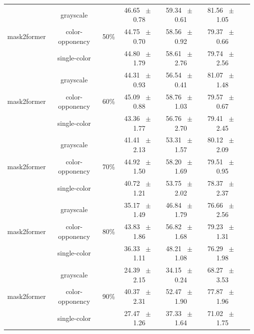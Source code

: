 \begin{table}[h]
\begin{tabular}{@{}lccc ccc@{}}
    \midrule
    \multirow{3}{*}{mask2former} & grayscale & \multirow{3}{*}{50\%} & 46.65 ~$\pm$~ 0.78 & 59.34 ~$\pm$~ 0.61 & 81.56 ~$\pm$~ 1.05 \\
    & color-opponency &  & 44.75 ~$\pm$~ 0.70 & 58.56 ~$\pm$~ 0.92 & 79.37 ~$\pm$~ 0.66 \\
    & single-color &  & 44.80 ~$\pm$~ 1.79 & 58.61 ~$\pm$~ 2.76 & 79.74 ~$\pm$~ 2.56 \\
    \midrule
    \multirow{3}{*}{mask2former} & grayscale & \multirow{3}{*}{60\%} & 44.31 ~$\pm$~ 0.93 & 56.54 ~$\pm$~ 0.41 & 81.07 ~$\pm$~ 1.48 \\
    & color-opponency &  & 45.09 ~$\pm$~ 0.88 & 58.76 ~$\pm$~ 1.03 & 79.57 ~$\pm$~ 0.67 \\
    & single-color &  & 43.36 ~$\pm$~ 1.77 & 56.76 ~$\pm$~ 2.70 & 79.41 ~$\pm$~ 2.45 \\
    \midrule
    \multirow{3}{*}{mask2former} & grayscale & \multirow{3}{*}{70\%} & 41.41 ~$\pm$~ 2.13 & 53.31 ~$\pm$~ 1.57 & 80.12 ~$\pm$~ 2.09 \\
    & color-opponency &  & 44.92 ~$\pm$~ 1.50 & 58.20 ~$\pm$~ 1.69 & 79.51 ~$\pm$~ 0.95 \\
    & single-color &  & 40.72 ~$\pm$~ 1.21 & 53.75 ~$\pm$~ 2.02 & 78.37 ~$\pm$~ 2.37 \\
    \midrule
    \multirow{3}{*}{mask2former} & grayscale & \multirow{3}{*}{80\%} & 35.17 ~$\pm$~ 1.49 & 46.84 ~$\pm$~ 1.79 & 76.66 ~$\pm$~ 2.56 \\
    & color-opponency &  & 43.83 ~$\pm$~ 1.86 & 56.82 ~$\pm$~ 1.68 & 79.23 ~$\pm$~ 1.31 \\
    & single-color &  & 36.33 ~$\pm$~ 1.11 & 48.21 ~$\pm$~ 1.08 & 76.29 ~$\pm$~ 1.98 \\
    \midrule
    \multirow{3}{*}{mask2former} & grayscale & \multirow{3}{*}{90\%} & 24.39 ~$\pm$~ 2.15 & 34.15 ~$\pm$~ 0.24 & 68.27 ~$\pm$~ 3.53 \\
    & color-opponency &  & 40.37 ~$\pm$~ 2.31 & 52.47 ~$\pm$~ 1.90 & 77.87 ~$\pm$~ 1.96 \\
    & single-color &  & 27.47 ~$\pm$~ 1.26 & 37.33 ~$\pm$~ 1.64 & 71.02 ~$\pm$~ 1.75 \\
    \midrule
    \bottomrule
  \end{tabular}
  \label{tab:sparse_results_mask2former_acdc_full}
\end{table}